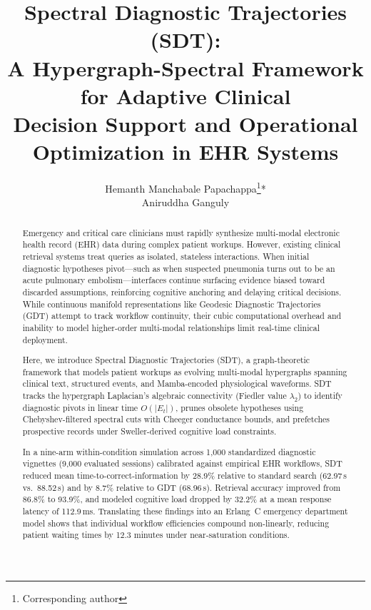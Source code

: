 \documentclass[10pt, onecolumn]{article}
\begin{document}
\title{%
  \textbf{Spectral Diagnostic Trajectories (SDT):}\\[4pt]
  \large A Hypergraph-Spectral Framework for Adaptive Clinical\\
  Decision Support and Operational Optimization in EHR Systems
}

\author{
Hemanth Manchabale Papachappa\thanks{Corresponding author}* \\
Aniruddha Ganguly
}



\date{}
\maketitle

\begin{abstract}
\noindent
Emergency and critical care clinicians must rapidly synthesize multi-modal electronic health record (EHR) data during complex patient workups. However, existing clinical retrieval systems treat queries as isolated, stateless interactions. When initial diagnostic hypotheses pivot---such as when suspected pneumonia turns out to be an acute pulmonary embolism---interfaces continue surfacing evidence biased toward discarded assumptions, reinforcing cognitive anchoring and delaying critical decisions. While continuous manifold representations like Geodesic Diagnostic Trajectories (GDT) attempt to track workflow continuity, their cubic computational overhead and inability to model higher-order multi-modal relationships limit real-time clinical deployment.

Here, we introduce Spectral Diagnostic Trajectories (SDT), a graph-theoretic framework that models patient workups as evolving multi-modal hypergraphs spanning clinical text, structured events, and Mamba-encoded physiological waveforms. SDT tracks the hypergraph Laplacian's algebraic connectivity (Fiedler value $\lambda_2$) to identify diagnostic pivots in linear time $O(|E_t|)$, prunes obsolete hypotheses using Chebyshev-filtered spectral cuts with Cheeger conductance bounds, and prefetches prospective records under Sweller-derived cognitive load constraints.

In a nine-arm within-condition simulation across 1{,}000 standardized diagnostic vignettes (9{,}000 evaluated sessions) calibrated against empirical EHR workflows, SDT reduced mean time-to-correct-information by 28.9\% relative to standard search (62.97\,s vs.\ 88.52\,s) and by 8.7\% relative to GDT (68.96\,s). Retrieval accuracy improved from 86.8\% to 93.9\%, and modeled cognitive load dropped by 32.2\% at a mean response latency of 112.9\,ms. Translating these findings into an Erlang~C emergency department model shows that individual workflow efficiencies compound non-linearly, reducing patient waiting times by 12.3 minutes under near-saturation conditions.
\end{abstract}
\end{document}
